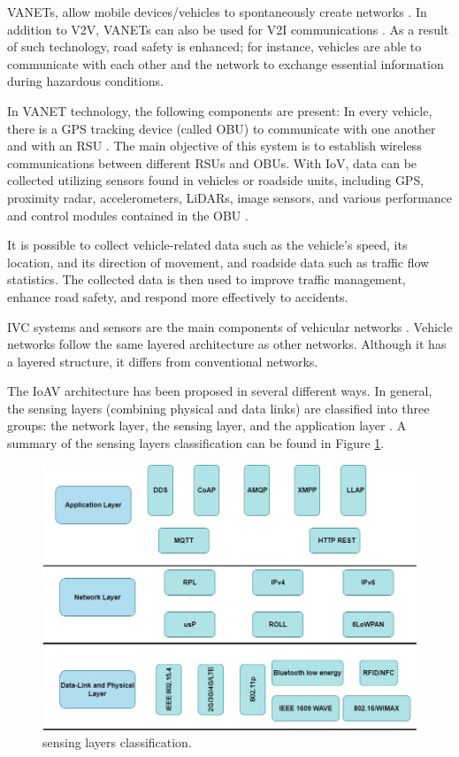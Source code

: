 \documentclass[a4paper,12pt]{article}
\begin{document}
\hspace{5mm} VANETs, allow mobile devices/vehicles to spontaneously create networks \cite{article24}. In addition to V2V, VANETs can also be used for V2I communications \cite{article24}. As a result of such technology, road safety is enhanced; for instance, vehicles are able to communicate with each other and the network to exchange essential information during hazardous conditions. 

\hspace{5mm} In VANET technology, the following components are present: In every vehicle, there is a GPS tracking device (called OBU) to communicate with one another and with an RSU \cite{article24}. The main objective of this system is to establish wireless communications between different RSUs and OBUs. With IoV, data can be collected utilizing sensors found in vehicles or roadside units, including GPS, proximity radar, accelerometers, LiDARs, image sensors, and various performance and control modules contained in the OBU \cite{article23}.

\hspace{5mm} It is possible to collect vehicle-related data such as the vehicle's speed, its location, and its direction of movement, and roadside data such as traffic flow statistics. The collected data is then used to improve traffic management, enhance road safety, and respond more effectively to accidents.

\hspace{5mm} IVC systems and sensors are the main components of vehicular networks \cite{article23}. Vehicle networks follow the same layered architecture as other networks. Although it has a layered structure, it differs from conventional networks.

\hspace{5mm} The IoAV architecture has been proposed in several different ways. In general, the sensing layers (combining physical and data links) are classified into three groups: the network layer, the sensing layer, and the application layer \cite{article23}. A summary of the sensing layers classification can be found in Figure \ref{fig:sensing layers classification}.


\begin{figure}[H]
  \centering
  \includegraphics*[width=0.8\columnwidth]
  {img/Layer-based classification of current standards}
  \caption{sensing layers classification.}   
  \label{fig:sensing layers classification}
\end{figure}
\end{document}
